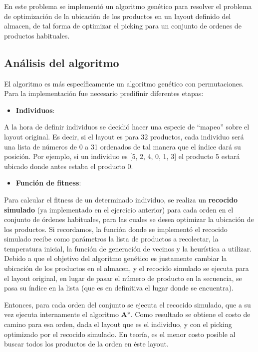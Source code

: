 \documentclass[
]{article}
\providecommand{\tightlist}{%
  \setlength{\itemsep}{0pt}\setlength{\parskip}{0pt}}
\begin{document}
En este problema se implementó un algoritmo genético para resolver el
problema de optimización de la ubicación de los productos en un layout
definido del almacen, de tal forma de optimizar el picking para un
conjunto de ordenes de productos habituales.

\hypertarget{anuxe1lisis-del-algoritmo-1}{%
\subsection{Análisis del algoritmo}\label{anuxe1lisis-del-algoritmo-1}}

El algoritmo es más específicamente un algoritmo genético con
permutaciones. Para la implementación fue necesario predifinir
diferentes etapas:

\begin{itemize}
\tightlist
\item
  \textbf{Individuos}:
\end{itemize}

A la hora de definir individuos se decidió hacer una especie de
``mapeo'' sobre el layout original. Es decir, si el layout es para 32
productos, cada individuo será una lista de números de 0 a 31 ordenados
de tal manera que el índice dará su posición. Por ejemplo, si un
individuo es {[}5, 2, 4, 0, 1, 3{]} el producto 5 estará ubicado donde
antes estaba el producto 0.

\begin{itemize}
\tightlist
\item
  \textbf{Función de fitness}:
\end{itemize}

Para calcular el fitness de un determinado individuo, se realiza un
\textbf{recocido simulado} (ya implementado en el ejercicio anterior)
para cada orden en el conjunto de órdenes habituales, para las cuales se
desea optimizar la ubicación de los productos. Si recordamos, la función
donde se implementó el recocido simulado recibe como parámetros la lista
de productos a recolectar, la temperatura inicial, la función de
generación de vecinos y la heurística a utilizar. Debido a que el
objetivo del algoritmo genético es justamente cambiar la ubicación de
los productos en el almacen, y el recocido simulado se ejecuta para el
layout original, en lugar de pasar el número de producto en la
secuencia, se pasa su índice en la lista (que es en definitiva el lugar
donde se encuentra).

Entonces, para cada orden del conjunto se ejecuta el recocido simulado,
que a su vez ejecuta internamente el algoritmo \textbf{A}*. Como
resultado se obtiene el costo de camino para esa orden, dada el layout
que es el individuo, y con el picking optimizado por el recocido
simulado. En teoría, es el menor costo posible al buscar todos los
productos de la orden en éste layout.
\end{document}
